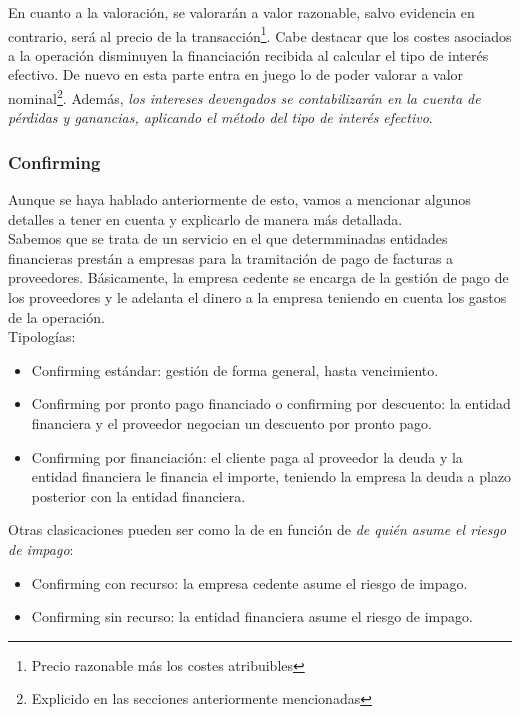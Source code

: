 \documentclass[a4paper,12pt]{article}
\begin{document}
En cuanto a la valoración, se valorarán a valor razonable, salvo evidencia en contrario, será al precio de la transacción\footnote{Precio razonable más los costes atribuibles}. Cabe destacar que los costes asociados a la operación disminuyen la financiación recibida al calcular el tipo de interés efectivo. De nuevo en esta parte entra en juego lo de poder valorar a valor nominal\footnote{Explicido en las secciones anteriormente mencionadas}. Además, \textit{los intereses devengados se contabilizarán en la cuenta de pérdidas y ganancias, aplicando el método del tipo de interés efectivo}.

\subsubsection{Confirming}

Aunque se haya hablado anteriormente de esto, vamos a mencionar algunos detalles a tener en cuenta y explicarlo de manera más detallada.\\

Sabemos que se trata de un servicio en el que determminadas entidades financieras prestán a empresas para la tramitación de pago de facturas a proveedores. Básicamente, la empresa cedente se encarga de la gestión de pago de los proveedores y le adelanta el dinero a la empresa teniendo en cuenta los gastos de la operación.\\

Tipologías:
\begin{itemize}
    \item Confirming estándar: gestión de forma general, hasta vencimiento.
    \item Confirming por pronto pago financiado o confirming por descuento: la entidad financiera y el proveedor negocian un descuento por pronto pago.
    \item Confirming por financiación: el cliente paga al proveedor la deuda y la entidad financiera le financia el importe, teniendo la empresa la deuda a plazo posterior con la entidad financiera.
\end{itemize}

Otras clasicaciones pueden ser como la de en función de \textit{de quién asume el riesgo de impago}:
\begin{itemize}
    \item Confirming con recurso: la empresa cedente asume el riesgo de impago.
    \item Confirming sin recurso: la entidad financiera asume el riesgo de impago.
\end{itemize}
\end{document}
